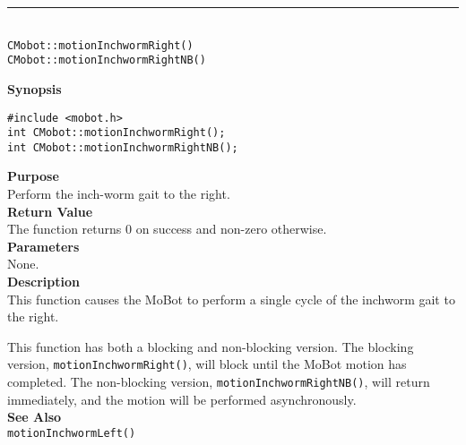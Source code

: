 \noindent
\vspace{5pt}
\rule{4.5in}{0.015in}\\
\noindent
{\LARGE \texttt{CMobot::motionInchwormRight()}}\\
{\LARGE \texttt{CMobot::motionInchwormRightNB()}}\\
{}

\noindent
{\bf Synopsis}\\
\begin{verbatim}
#include <mobot.h>
int CMobot::motionInchwormRight();
int CMobot::motionInchwormRightNB();
\end{verbatim}

\noindent
{\bf Purpose}\\
Perform the inch-worm gait to the right.\\

\noindent
{\bf Return Value}\\
The function returns 0 on success and non-zero otherwise.\\

\noindent
{\bf Parameters}\\
None.\\

\noindent
{\bf Description}\\
This function causes the MoBot to perform a single cycle of the inchworm gait
to the right. 

This function has both a blocking and non-blocking version.
The blocking version, \texttt{motionInchwormRight()}, will block until the
MoBot motion has completed. The non-blocking version, \texttt{motionInchwormRightNB()},
will return immediately, and the motion will be performed asynchronously.\\

\noindent
{\bf See Also}\\
\texttt{motionInchwormLeft()}

